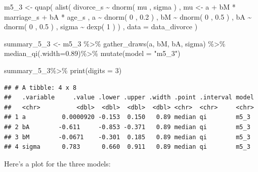 \documentclass[
]{book}
\newenvironment{Shaded}{\begin{snugshade}}{\end{snugshade}}
\newcommand{\AttributeTok}[1]{\textcolor[rgb]{0.77,0.63,0.00}{#1}}
\newcommand{\DecValTok}[1]{\textcolor[rgb]{0.00,0.00,0.81}{#1}}
\newcommand{\FloatTok}[1]{\textcolor[rgb]{0.00,0.00,0.81}{#1}}
\newcommand{\FunctionTok}[1]{\textcolor[rgb]{0.00,0.00,0.00}{#1}}
\newcommand{\NormalTok}[1]{#1}
\newcommand{\OtherTok}[1]{\textcolor[rgb]{0.56,0.35,0.01}{#1}}
\newcommand{\SpecialCharTok}[1]{\textcolor[rgb]{0.00,0.00,0.00}{#1}}
\newcommand{\StringTok}[1]{\textcolor[rgb]{0.31,0.60,0.02}{#1}}
\begin{document}
\begin{Shaded}
\begin{Highlighting}[]
\NormalTok{m5\_3 }\OtherTok{\textless{}{-}} \FunctionTok{quap}\NormalTok{( }
  \FunctionTok{alist}\NormalTok{( }
\NormalTok{    divorce\_s }\SpecialCharTok{\textasciitilde{}} \FunctionTok{dnorm}\NormalTok{( mu , sigma ) , }
\NormalTok{    mu }\OtherTok{\textless{}{-}}\NormalTok{ a }\SpecialCharTok{+}\NormalTok{ bM }\SpecialCharTok{*}\NormalTok{ marriage\_s }\SpecialCharTok{+}\NormalTok{ bA }\SpecialCharTok{*}\NormalTok{ age\_s , }
\NormalTok{    a }\SpecialCharTok{\textasciitilde{}} \FunctionTok{dnorm}\NormalTok{( }\DecValTok{0}\NormalTok{ , }\FloatTok{0.2}\NormalTok{ ) , }
\NormalTok{    bM }\SpecialCharTok{\textasciitilde{}} \FunctionTok{dnorm}\NormalTok{( }\DecValTok{0}\NormalTok{ , }\FloatTok{0.5}\NormalTok{ ) ,}
\NormalTok{    bA }\SpecialCharTok{\textasciitilde{}} \FunctionTok{dnorm}\NormalTok{( }\DecValTok{0}\NormalTok{ , }\FloatTok{0.5}\NormalTok{ ) , }
\NormalTok{    sigma }\SpecialCharTok{\textasciitilde{}} \FunctionTok{dexp}\NormalTok{( }\DecValTok{1}\NormalTok{ )}
\NormalTok{) , }\AttributeTok{data =}\NormalTok{ data\_divorce )}

\NormalTok{summary\_5\_3 }\OtherTok{\textless{}{-}}\NormalTok{ m5\_3 }\SpecialCharTok{\%\textgreater{}\%}
  \FunctionTok{gather\_draws}\NormalTok{(a, bM, bA, sigma) }\SpecialCharTok{\%\textgreater{}\%}
  \FunctionTok{median\_qi}\NormalTok{(}\AttributeTok{.width=}\FloatTok{0.89}\NormalTok{)}\SpecialCharTok{\%\textgreater{}\%}
  \FunctionTok{mutate}\NormalTok{(}\AttributeTok{model =} \StringTok{"m5\_3"}\NormalTok{)}

\NormalTok{summary\_5\_3}\SpecialCharTok{\%\textgreater{}\%}
  \FunctionTok{print}\NormalTok{(}\AttributeTok{digits =} \DecValTok{3}\NormalTok{)}
\end{Highlighting}
\end{Shaded}

\begin{verbatim}
## # A tibble: 4 x 8
##   .variable     .value .lower .upper .width .point .interval model
##   <chr>          <dbl>  <dbl>  <dbl>  <dbl> <chr>  <chr>     <chr>
## 1 a          0.0000920 -0.153  0.150   0.89 median qi        m5_3 
## 2 bA        -0.611     -0.853 -0.371   0.89 median qi        m5_3 
## 3 bM        -0.0671    -0.301  0.185   0.89 median qi        m5_3 
## 4 sigma      0.783      0.660  0.911   0.89 median qi        m5_3
\end{verbatim}

Here's a plot for the three models:
\end{document}
